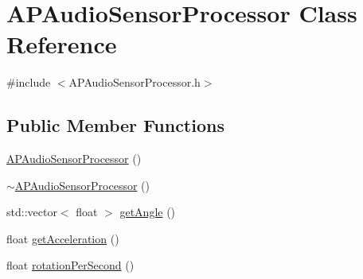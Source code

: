 \hypertarget{class_a_p_audio_sensor_processor}{\section{A\+P\+Audio\+Sensor\+Processor Class Reference}
\label{class_a_p_audio_sensor_processor}
}


{\ttfamily \#include $<$A\+P\+Audio\+Sensor\+Processor.\+h$>$}

\subsection*{Public Member Functions}
\begin{DoxyCompactItemize}
\item 
\hyperlink{class_a_p_audio_sensor_processor_a1f99c785d5ecc871ffe5ce40c68af77f}{A\+P\+Audio\+Sensor\+Processor} ()
\item 
\hyperlink{class_a_p_audio_sensor_processor_abe7707e46534a4257147d2917bfb0ec3}{$\sim$\+A\+P\+Audio\+Sensor\+Processor} ()
\item 
std\+::vector$<$ float $>$ \hyperlink{class_a_p_audio_sensor_processor_a7714b413ffaa62aac39c9f19e1ad2bfe}{get\+Angle} ()
\item 
float \hyperlink{class_a_p_audio_sensor_processor_af1f016dee1b395af7499b1a07169a1c0}{get\+Acceleration} ()
\item 
float \hyperlink{class_a_p_audio_sensor_processor_ab41051eac54068b3502910a8d4b72a84}{rotation\+Per\+Second} ()
\end{DoxyCompactItemize}


